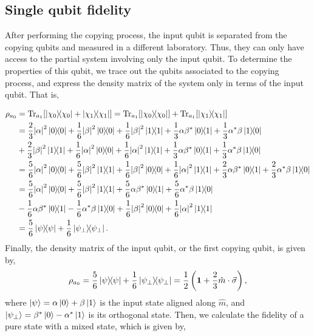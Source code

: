\subsection{Single qubit fidelity}

After performing the copying process, the input qubit is separated from the copying qubits and measured in a different laboratory. Thus, they can only have access to the partial system involving only the input qubit. To determine the properties of this qubit, we trace out the qubits associated to the copying process, and express the density matrix of the system only in terms of the input qubit. That is,

\begin{align*}
    \rho_{a_0}&=\Tr_{a_1}[\ketbra{\chi_0}{\chi_0}+\ketbra{\chi_1}{\chi_1}]=\Tr_{a_1}[\ketbra{\chi_0}{\chi_0}]+\Tr_{a_1}[\ketbra{\chi_1}{\chi_1}]\\
    &=\frac{2}{3}\abs{\alpha}^2\ketbra{0}{0}+\frac{1}{6}\abs{\beta}^2\ketbra{0}{0}+\frac{1}{6}\abs{\beta}^2\ketbra{1}{1}+\frac{1}{3}\alpha\beta^*\ketbra{0}{1}+\frac{1}{3}\alpha^*\beta\ketbra{1}{0}\\
    &+\frac{2}{3}\abs{\beta}^2\ketbra{1}{1}+\frac{1}{6}\abs{\alpha}^2\ketbra{0}{0}+\frac{1}{6}\abs{\alpha}^2\ketbra{1}{1}+\frac{1}{3}\alpha\beta^*\ketbra{0}{1}+\frac{1}{3}\alpha^*\beta\ketbra{1}{0}\\
    &=\frac{5}{6}\abs{\alpha}^2\ketbra{0}{0}+\frac{5}{6}\abs{\beta}^2\ketbra{1}{1}+\frac{1}{6}\abs{\beta}^2\ketbra{0}{0}+\frac{1}{6}\abs{\alpha}^2\ketbra{1}{1}+\frac{2}{3}\alpha\beta^*\ketbra{0}{1}+\frac{2}{3}\alpha^*\beta\ketbra{1}{0}\\
    &=\frac{5}{6}\abs{\alpha}^2\ketbra{0}{0}+\frac{5}{6}\abs{\beta}^2\ketbra{1}{1}+\frac{5}{6}\alpha\beta^*\ketbra{0}{1}+\frac{5}{6}\alpha^*\beta\ketbra{1}{0}\\
    &-\frac{1}{6}\alpha\beta^*\ketbra{0}{1}-\frac{1}{6}\alpha^*\beta\ketbra{1}{0}+\frac{1}{6}\abs{\beta}^2\ketbra{0}{0}+\frac{1}{6}\abs{\alpha}^2\ketbra{1}{1}\\
    &=\frac{5}{6}\ketbra{\psi}{\psi}+\frac{1}{6}\ketbra{\psi_{\perp}}{\psi_{\perp}}.
\end{align*}
Finally, the density matrix of the input qubit, or the first copying qubit, is given by,
\begin{equation}
\rho_{a_0}=\frac{5}{6}\ketbra{\psi}{\psi}+\frac{1}{6}\ketbra{\psi_{\perp}}{\psi_{\perp}}=\frac{1}{2}\left(\mathbf{1} + \frac{2}{3} \hat{m}\cdot\vec{\sigma} \right),
\end{equation}
where $\ket{\psi}=\alpha\ket{0}+\beta\ket{1}$ is the input state aligned along $\hat{m}$, and $\ket{\psi_{\perp}}=\beta^*\ket{0}-\alpha^*\ket{1}$ is its orthogonal state. Then, we calculate the fidelity of a pure state with a mixed state, which is given by,
